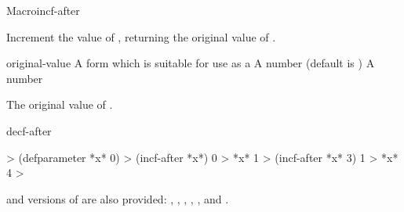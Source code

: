 \documentclass[10pt,twoside,english,pdftex]{article}
\begin{document}
\begin{functiondoc}{Macro}{incf-after}{
     
    \returns{} }
%

\fnsyntax

\fnpurpose Increment the value of , returning the original value of
.

\fnpackage {}

\fnmodule {}

\fnargs
\begin{args}{original-value}
\arg[place] A form which is suitable for use as a 
\arg[increment] A number  (default is )
 A number
\end{args}

\fnreturns The original value of .

\begin{alsos}{decf-after}
\end{alsos}

\fnexamples
\begin{example}
%
\W\supp
  > (defparameter *x* 0)
  > (incf-after *x*)
  0 
  > *x*
  1
  > (incf-after *x* 3)
  1
  > *x*
  4
  >
\end{example}

\fnnote
%
%
%
%
%
%
%
%
 and  versions of  are also
provided: , ,
, ,
, and .

\end{functiondoc}

\end{document}
